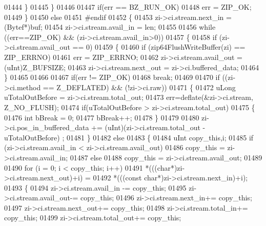\begin{DoxyCode}
01444         \}
01445       \}
01446 
01447       \textcolor{keywordflow}{if}(err == BZ\_RUN\_OK)
01448         err = ZIP\_OK;
01449     \}
01450     \textcolor{keywordflow}{else}
01451 \textcolor{preprocessor}{#endif}
01452     \{
01453       zi->ci.stream.next\_in = (Bytef*)buf;
01454       zi->ci.stream.avail\_in = len;
01455 
01456       \textcolor{keywordflow}{while} ((err==ZIP\_OK) && (zi->ci.stream.avail\_in>0))
01457       \{
01458           \textcolor{keywordflow}{if} (zi->ci.stream.avail\_out == 0)
01459           \{
01460               \textcolor{keywordflow}{if} (zip64FlushWriteBuffer(zi) == ZIP\_ERRNO)
01461                   err = ZIP\_ERRNO;
01462               zi->ci.stream.avail\_out = (uInt)Z\_BUFSIZE;
01463               zi->ci.stream.next\_out = zi->ci.buffered\_data;
01464           \}
01465 
01466 
01467           \textcolor{keywordflow}{if}(err != ZIP\_OK)
01468               \textcolor{keywordflow}{break};
01469 
01470           \textcolor{keywordflow}{if} ((zi->ci.method == Z\_DEFLATED) && (!zi->ci.raw))
01471           \{
01472               uLong uTotalOutBefore = zi->ci.stream.total\_out;
01473               err=deflate(&zi->ci.stream,  Z\_NO\_FLUSH);
01474               \textcolor{keywordflow}{if}(uTotalOutBefore > zi->ci.stream.total\_out)
01475               \{
01476                 \textcolor{keywordtype}{int} bBreak = 0;
01477                 bBreak++;
01478               \}
01479 
01480               zi->ci.pos\_in\_buffered\_data += (uInt)(zi->ci.stream.total\_out - uTotalOutBefore) ;
01481           \}
01482           \textcolor{keywordflow}{else}
01483           \{
01484               uInt copy\_this,i;
01485               \textcolor{keywordflow}{if} (zi->ci.stream.avail\_in < zi->ci.stream.avail\_out)
01486                   copy\_this = zi->ci.stream.avail\_in;
01487               \textcolor{keywordflow}{else}
01488                   copy\_this = zi->ci.stream.avail\_out;
01489 
01490               \textcolor{keywordflow}{for} (i = 0; i < copy\_this; i++)
01491                   *(((\textcolor{keywordtype}{char}*)zi->ci.stream.next\_out)+i) =
01492                       *(((\textcolor{keyword}{const} \textcolor{keywordtype}{char}*)zi->ci.stream.next\_in)+i);
01493               \{
01494                   zi->ci.stream.avail\_in -= copy\_this;
01495                   zi->ci.stream.avail\_out-= copy\_this;
01496                   zi->ci.stream.next\_in+= copy\_this;
01497                   zi->ci.stream.next\_out+= copy\_this;
01498                   zi->ci.stream.total\_in+= copy\_this;
01499                   zi->ci.stream.total\_out+= copy\_this;

\end{DoxyCode}
